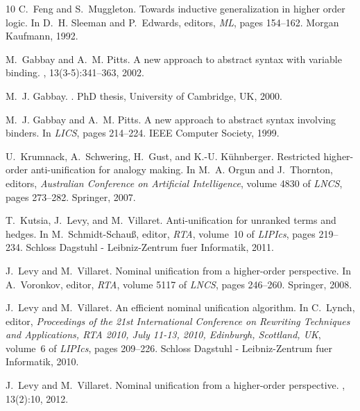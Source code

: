 \documentclass[11pt,a4paper]{amsart}
\theoremstyle{definition}
\begin{document}
\begin{thebibliography}{10}
C.~Feng and S.~Muggleton.
\newblock Towards inductive generalization in higher order logic.
\newblock In D.~H. Sleeman and P.~Edwards, editors, {\em ML}, pages 154--162.
  Morgan Kaufmann, 1992.

M.~Gabbay and A.~M. Pitts.
\newblock A new approach to abstract syntax with variable binding.
, 13(3-5):341--363, 2002.

M.~J. Gabbay.
.
\newblock PhD thesis, University of Cambridge, UK, 2000.

M.~J. Gabbay and A.~M. Pitts.
\newblock A new approach to abstract syntax involving binders.
\newblock In {\em LICS}, pages 214--224. IEEE Computer Society, 1999.

U.~Krumnack, A.~Schwering, H.~Gust, and K.-U. K{\"u}hnberger.
\newblock Restricted higher-order anti-unification for analogy making.
\newblock In M.~A. Orgun and J.~Thornton, editors, {\em Australian Conference
  on Artificial Intelligence}, volume 4830 of {\em LNCS}, pages 273--282.
  Springer, 2007.

T.~Kutsia, J.~Levy, and M.~Villaret.
\newblock Anti-unification for unranked terms and hedges.
\newblock In M.~Schmidt-Schau{\ss}, editor, {\em RTA}, volume~10 of {\em
  LIPIcs}, pages 219--234. Schloss Dagstuhl - Leibniz-Zentrum fuer Informatik,
  2011.

J.~Levy and M.~Villaret.
\newblock Nominal unification from a higher-order perspective.
\newblock In A.~Voronkov, editor, {\em RTA}, volume 5117 of {\em LNCS}, pages
  246--260. Springer, 2008.

J.~Levy and M.~Villaret.
\newblock An efficient nominal unification algorithm.
\newblock In C.~Lynch, editor, {\em Proceedings of the 21st International
  Conference on Rewriting Techniques and Applications, {RTA} 2010, July 11-13,
  2010, Edinburgh, Scottland, {UK}}, volume~6 of {\em LIPIcs}, pages 209--226.
  Schloss Dagstuhl - Leibniz-Zentrum fuer Informatik, 2010.

J.~Levy and M.~Villaret.
\newblock Nominal unification from a higher-order perspective.
, 13(2):10, 2012.


\end{thebibliography}
\end{document}
